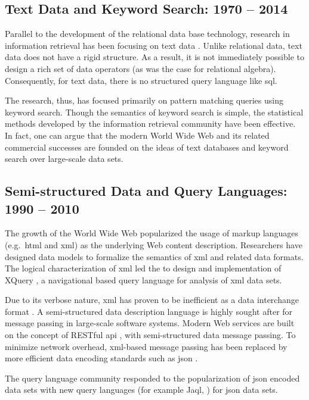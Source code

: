 	\subsection{Text Data and Keyword Search:  1970 -- 2014}
		Parallel to the development of the relational data base technology, research in information retrieval has been focusing on text data \cite{salton-88, jones-72}.  Unlike relational data, text data does not have a rigid structure.  As a result, it is not immediately possible to design a rich set of data operators (as was the case for relational algebra).  Consequently, for text data, there is no structured query language like \gls{sql}.
		
		The research, thus, has focused primarily on pattern matching queries using keyword search.  Though the semantics of keyword search is simple, the statistical methods developed by the information retrieval community \cite{salton-88, robertson-09, dumais-88} have been effective.  In fact, one can argue that the modern World Wide Web and its related commercial successes are founded on the ideas of text databases and keyword search over large-scale data sets.
		
	\subsection{Semi-structured Data and Query Languages:  1990 -- 2010}
		The growth of the World Wide Web popularized the usage of markup languages (e.g.~\gls{html} and \gls{xml}) as the underlying Web content description.  Researchers have designed data models \cite{suciu-98} to formalize the semantics of \gls{xml} and related data formats.  The logical characterization of \gls{xml} led the to design and implementation of XQuery \cite{xquery-10}, a navigational based query language for analysis of \gls{xml} data sets.
		
		Due to its verbose nature, \gls{xml} has proven to be inefficient as a data interchange format \cite{schneider-14}.  A semi-structured data description language is highly sought after for message passing in large-scale software systems.  Modern Web services are built on the concept of RESTful \gls{api} \cite{restful-11}, with semi-structured data message passing.  To minimize network overhead, \gls{xml}-based message passing has been replaced by more efficient data encoding standards such as \gls{json} \cite{json}.
		
		The query language community responded to the popularization of \gls{json} encoded data sets with new query languages \cite{simeon-13} (for example Jaql, \cite{ibm-jaql}) for \gls{json} data sets.
	
